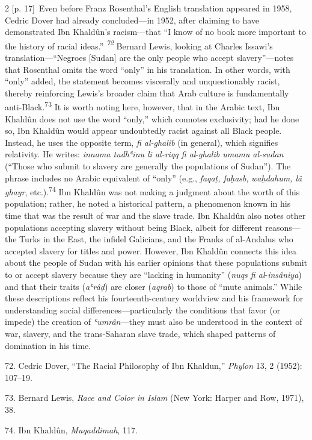 \documentclass[10pt,a4paper]{article}
\begin{document}
\begin{paracol}{2}
{\scriptsize\color{gray} [p. 17]}\ Even before Franz Rosenthal’s English translation appeared in 1958, Cedric Dover had already concluded—in 1952, after claiming to have demonstrated Ibn Khaldûn’s racism—that “I know of no book more important to the history of racial ideas.”\textit{ \nobreak\textsuperscript{72} } Bernard Lewis, looking at Charles Issawi’s translation—“Negroes [Sudan] are the only people who accept slavery”—notes that Rosenthal omits the word “only” in his translation. In other words, with “only” added, the statement becomes viscerally and unquestionably racist, thereby reinforcing Lewis’s broader claim that Arab culture is fundamentally anti-Black.\nobreak\textsuperscript{73} It is worth noting here, however, that in the Arabic text, Ibn Khaldûn does not use the word “only,” which connotes exclusivity; had he done so, Ibn Khaldûn would appear undoubtedly racist against all Black people. Instead, he uses the opposite term, \textit{fi al-ghalib} (in general), which signifies relativity. He writes: \textit{innama tudhʿinu li al-riqq fi al}-\textit{ghalib umamu al-sudan} (“Those who submit to slavery are generally the populations of Sudan”). The phrase includes no Arabic equivalent of “only” (e.g., \textit{faqaṭ, faḥasb}, \textit{waḥdahum, lâ ghayr}, etc.).\nobreak\textsuperscript{74} Ibn Khaldûn was not making a judgment about the worth of this population; rather, he noted a historical pattern, a phenomenon known in his time that was the result of war and the slave trade. Ibn Khaldûn also notes other populations accepting slavery without being Black, albeit for different reasons—the Turks in the East, the infidel Galicians, and the Franks of al-Andalus who accepted slavery for titles and power. However, Ibn Khaldûn connects this idea about the people of Sudan with his earlier opinions that these populations submit to or accept slavery because they are “lacking in humanity” (\textit{nuqs fi al}-\textit{insâniya}) and that their traits (\textit{aʿrâḍ}) are closer (\textit{aqrab}) to those of “mute animals.” While these descriptions reflect his fourteenth-century worldview and his framework for understanding social differences—particularly the conditions that favor (or impede) the creation of \textit{ʿumrân}—they must also be understood in the context of war, slavery, and the trans-Saharan slave trade, which shaped patterns of domination in his time.\par{\small 72. Cedric Dover, “The Racial Philosophy of Ibn Khaldun,” \textit{Phylon} 13, 2 (1952): 107–19.\par}{\small 73. Bernard Lewis, \textit{Race and Color in Islam} (New York: Harper and Row, 1971), 38.\par}{\small 74. Ibn Khaldûn, \textit{Muqaddimah}, 117.\par}

\end{paracol}
\end{document}
